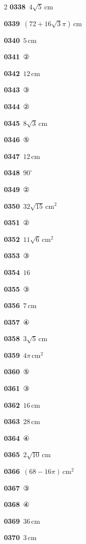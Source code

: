 \documentclass[10pt,a4paper]{article}
\begin{document}
\begin{multicols}{2}
\noindent\textbf{0338}\ $4\sqrt{5}\,\mathrm{cm}$\par
\noindent\textbf{0339}\ $(72+16\sqrt{3}\pi)\,\mathrm{cm}$\par
\noindent\textbf{0340}\ $5\,\mathrm{cm}$\par
\noindent\textbf{0341}\ ②\par
\noindent\textbf{0342}\ $12\,\mathrm{cm}$\par
\noindent\textbf{0343}\ ③\par
\noindent\textbf{0344}\ ②\par
\noindent\textbf{0345}\ $8\sqrt{3}\,\mathrm{cm}$\par
\noindent\textbf{0346}\ ⑤\par
\noindent\textbf{0347}\ $12\,\mathrm{cm}$\par
\noindent\textbf{0348}\ $90^\circ$\par
\noindent\textbf{0349}\ ②\par
\noindent\textbf{0350}\ $32\sqrt{15}\,\mathrm{cm}^2$\par
\noindent\textbf{0351}\ ②\par
\noindent\textbf{0352}\ $11\sqrt{6}\,\mathrm{cm}^2$\par
\noindent\textbf{0353}\ ③\par
\noindent\textbf{0354}\ $16$\par
\noindent\textbf{0355}\ ③\par
\noindent\textbf{0356}\ $7\,\mathrm{cm}$\par
\noindent\textbf{0357}\ ④\par
\noindent\textbf{0358}\ $3\sqrt{5}\,\mathrm{cm}$\par
\noindent\textbf{0359}\ $4\pi\,\mathrm{cm}^2$\par
\noindent\textbf{0360}\ ⑤\par
\noindent\textbf{0361}\ ③\par
\noindent\textbf{0362}\ $16\,\mathrm{cm}$\par
\noindent\textbf{0363}\ $28\,\mathrm{cm}$\par
\noindent\textbf{0364}\ ④\par
\noindent\textbf{0365}\ $2\sqrt{10}\,\mathrm{cm}$\par
\noindent\textbf{0366}\ $(68-16\pi)\,\mathrm{cm}^2$\par
\noindent\textbf{0367}\ ③\par
\noindent\textbf{0368}\ ④\par
\noindent\textbf{0369}\ $36\,\mathrm{cm}$\par
\noindent\textbf{0370}\ $3\,\mathrm{cm}$\par

\end{multicols}
\end{document}
